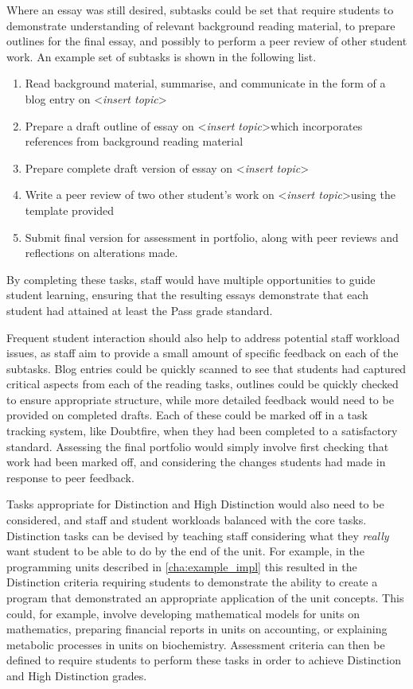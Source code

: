 Where an essay was still desired, subtasks could be set that require students to demonstrate understanding of relevant background reading material, to prepare outlines for the final essay, and possibly to perform a peer review of other student work. An example set of subtasks is shown in the following list. 

\begin{enumerate}
	\item Read background material, summarise, and communicate in the form of a blog entry on \textless \emph{insert topic}\textgreater
	\item Prepare a draft outline of essay on \textless \emph{insert topic}\textgreater which incorporates references from background reading material
	\item Prepare complete draft version of essay on \textless \emph{insert topic}\textgreater
	\item Write a peer review of two other student's work on \textless \emph{insert topic}\textgreater using the template provided
	\item Submit final version for assessment in portfolio, along with peer reviews and reflections on alterations made.
\end{enumerate}

By completing these tasks, staff would have multiple opportunities to guide student learning, ensuring that the resulting essays demonstrate that each student had attained at least the Pass grade standard. 

Frequent student interaction should also help to address potential staff workload issues, as staff aim to provide a small amount of specific feedback on each of the subtasks. Blog entries could be quickly scanned to see that students had captured critical aspects from each of the reading tasks, outlines could be quickly checked to ensure appropriate structure, while more detailed feedback would need to be provided on completed drafts. Each of these could be marked off in a task tracking system, like Doubtfire, when they had been completed to a satisfactory standard. Assessing the final portfolio would simply involve first checking that work had been marked off, and considering the changes students had made in response to peer feedback.

Tasks appropriate for Distinction and High Distinction would also need to be considered, and staff and student workloads balanced with the core tasks. Distinction tasks can be devised by teaching staff considering what they \emph{really} want student to be able to do by the end of the unit. For example, in the programming units described in \cref{cha:example_impl} this resulted in the Distinction criteria requiring students to demonstrate the ability to create a program that demonstrated an appropriate application of the unit concepts. This could, for example, involve developing mathematical models for units on mathematics, preparing financial reports in units on accounting, or explaining metabolic processes in units on biochemistry. Assessment criteria can then be defined to require students to perform these tasks in order to achieve Distinction and High Distinction grades.

